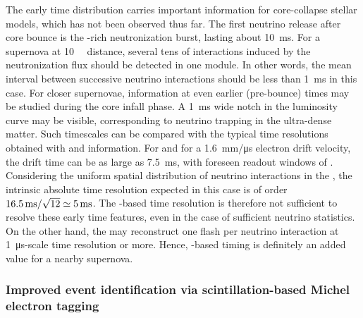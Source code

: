 The early time distribution carries important information for core-collapse stellar models, which has not been observed thus far. The first neutrino release after core bounce is the \nue-rich neutronization burst, lasting about \SI{10}{\ms}. For a supernova at \SI{10}{\kilo\parsec} distance, several tens of interactions induced by the neutronization flux should be detected in one  module. In other words, the mean interval between successive neutrino interactions should be less than \SI{1}{\ms} in this case. For closer supernovae, information at even earlier (pre-bounce) times may be studied during the core infall phase. A \SI{1}{\ms} wide notch in the luminosity curve may be visible, corresponding to neutrino trapping in the ultra-dense matter. Such timescales can be compared with the typical time resolutions obtained with  and  information. For   and for a \SI{1.6}{mm/\micro\s} electron drift velocity, the drift time can be as large as \SI{7.5}{\ms}, with foreseen readout windows of \dpreadout. Considering the uniform spatial distribution of neutrino interactions in the , the intrinsic absolute time resolution expected in this case is of order $\dpreadout/\sqrt{12}\simeq \SI{5}{\ms}$. The -based time resolution is therefore not sufficient to resolve these early time features, even in the case of sufficient neutrino statistics. On the other hand, the  may reconstruct one flash per  neutrino interaction at \SI{1}{\micro\s}-scale time resolution or more. Hence, -based timing is definitely an added value for a nearby supernova.

\subsubsection{Improved event identification via scintillation-based Michel electron tagging}

